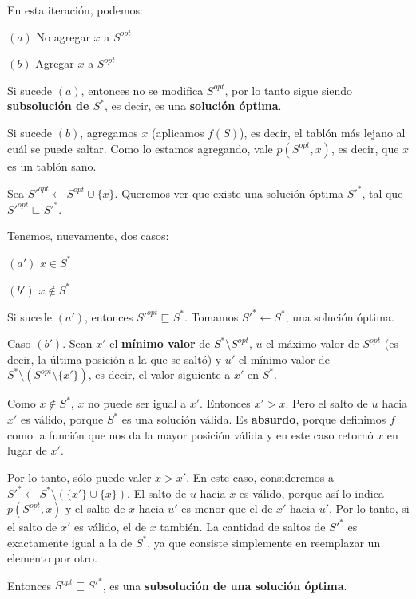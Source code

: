 \begin{itemize}
\begin{itemize}
    En esta iteración, podemos: \medskip

    $(a)$ No agregar $x$ a $S^{opt}$

    $(b)$ Agregar $x$ a $S^{opt}$ \medskip

    Si sucede $(a)$, entonces no se modifica $S^{opt}$, por lo tanto sigue
    siendo \textbf{subsolución de $S^{*}$}, es decir, es una \textbf{solución óptima}. \medskip

    Si sucede $(b)$, agregamos $x$ (aplicamos $f(S)$), es decir, el tablón más
    lejano al cuál se puede saltar. Como lo estamos agregando, vale
    $p(S^{opt}, x)$, es decir, que $x$ es un tablón sano. \medskip

    Sea $S'^{opt} \gets S^{opt} \cup \{x\}$. Queremos ver que existe una
    solución óptima $S'^{*}$, tal que $S'^{opt} \sqsubseteq S'^{*}$. \medskip

    Tenemos, nuevamente, dos casos: \medskip

    $(a')$ $x \in S^{*}$

    $(b')$ $x \notin S^{*}$ \medskip

    Si sucede $(a')$, entonces $S'^{opt} \sqsubseteq S^{*}$.
    Tomamos $S'^{*} \gets S^{*}$, una solución óptima. \medskip

    Caso $(b')$. Sean $x'$ el \textbf{mínimo valor} de $S^{*} \setminus S^{opt}$,
    $u$ el máximo valor de $S^{opt}$ (es decir, la última posición a la que
    se saltó) y $u'$ el mínimo valor de $S^{*} \setminus (S^{opt} \setminus \{x'\})$, es
    decir, el valor siguiente a $x'$ en $S^{*}$.

    Como $x \notin S^{*}$, $x$ no puede ser igual a $x'$. Entonces $x' > x$.
    Pero el salto de $u$ hacia $x'$ es válido, porque $S^{*}$ es una solución
    válida. Es \textbf{absurdo}, porque definimos $f$ como la función que nos
    da la mayor posición válida y en este caso retornó $x$ en lugar de $x'$.

    Por lo tanto, sólo puede valer $x > x'$. En este caso, consideremos a
    $S'^{*} \gets S^{*} \setminus (\{x'\} \cup \{x\})$. El salto de $u$ hacia $x$ es
    válido, porque así lo indica $p(S^{opt}, x)$ y el salto de $x$ hacia $u'$
    es menor que el de $x'$ hacia $u'$. Por lo tanto, si el salto de $x'$ es válido,
    el de $x$ también. La cantidad de saltos de $S'^{*}$ es exactamente igual a la de
    $S^{*}$, ya que consiste simplemente en reemplazar un elemento por otro.

    Entonces $S^{opt} \sqsubseteq S'^{*}$, es una \textbf{subsolución de una solución óptima}.


\end{itemize}
\end{itemize}
